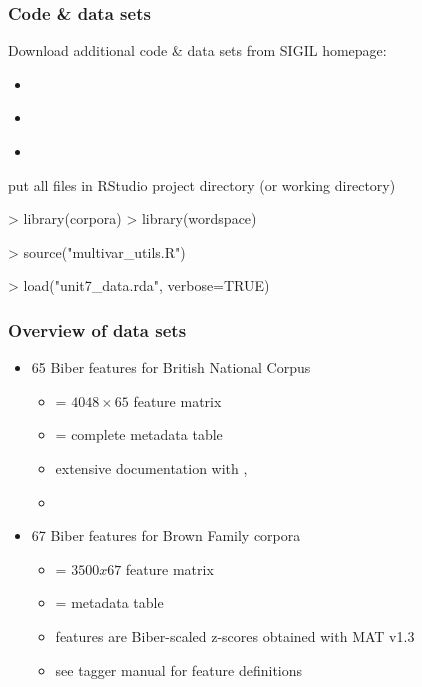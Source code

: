 \documentclass[t]{beamer} %
\begin{document}
\begin{frame}[fragile]
  \frametitle{Code \& data sets}

  Download additional code \& data sets from SIGIL homepage:
  \begin{itemize}
  \item \href{http://www.stefan-evert.de/SIGIL/sigil_R/materials/multivar_utils.R}{}
  \item \href{http://www.stefan-evert.de/SIGIL/sigil_R/data/unit7_data.rda}{}
  \item[]
  \end{itemize}

  \hand{} put all files in RStudio project directory (or working directory)

  \gap[1]
\begin{Rcode}
> library(corpora)           
> library(wordspace)         

> source("multivar_utils.R") 

> load("unit7_data.rda", verbose=TRUE) 
\end{Rcode}
\end{frame}

\begin{frame}
  \frametitle{Overview of data sets}

  \begin{itemize}
  \item 65 Biber features for British National Corpus
    \begin{itemize}
    \item {} = $4048\times 65$ feature matrix
    \item {} = complete metadata table
    \item extensive documentation with , 
    \item[]
    \end{itemize}
  \item 67 Biber features for Brown Family corpora
    \begin{itemize}
    \item {} = $3500 x 67$ feature matrix
    \item {} = metadata table
    \item features are Biber-scaled z-scores obtained with MAT v1.3\\
      {\footnotesize{}}
    \item see tagger manual for feature definitions
    \end{itemize}
  \end{itemize}
\end{frame}
\end{document}
